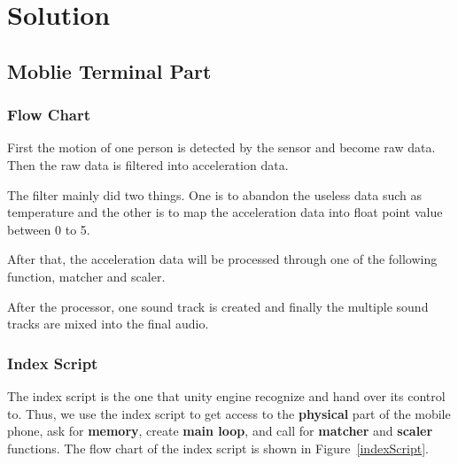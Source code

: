 \section{Solution}

\subsection{Moblie Terminal Part}

\subsubsection{Flow Chart}

\hspace*{2em}First the motion of one person is detected by the sensor and become
raw data. 
   Then the raw data is filtered into acceleration data. 

   The filter mainly did two things.
   One is to abandon the useless data such as temperature and the other is to
   map the acceleration data into float point value between 0 to 5. 

   After that, the acceleration data will be processed through one of the
   following function, matcher and scaler. 

   After the processor, one sound track is created and finally the multiple
   sound tracks are mixed into the final audio. 

\subsubsection{Index Script}

The index script is the one that unity engine recognize and hand over its
control to. 
Thus, we use the index script to get access to the \textbf{physical} part of the
mobile phone, ask for \textbf{memory}, create \textbf{main loop}, and call for
\textbf{matcher} and \textbf{scaler} functions.
The flow chart of the index script is shown in Figure~\ref{indexScript}.

